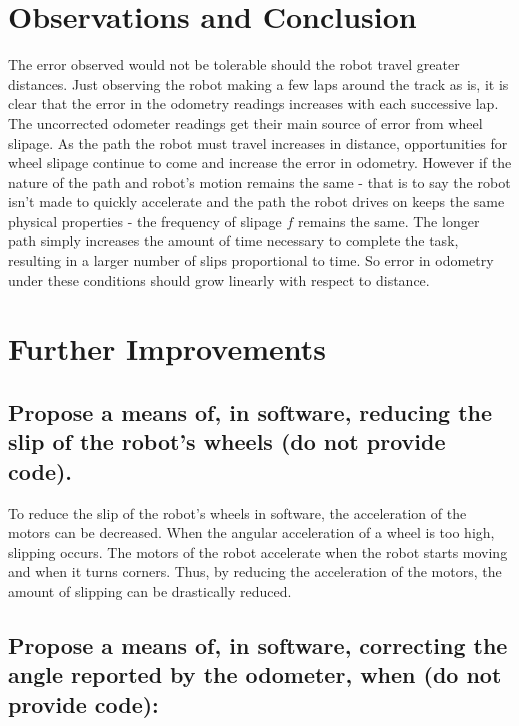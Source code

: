 \documentclass[11pt]{article} %
\begin{document}
\section{Observations and Conclusion}
The error observed would not be tolerable should the robot travel greater distances. Just observing the robot making a few laps around the track as is, it is clear that the error in the odometry readings increases with each successive lap. The uncorrected odometer readings get their main source of error from wheel slipage. As the path the robot must travel increases in distance, opportunities for wheel slipage continue to come and increase the error in odometry. However if the nature of the path and robot's motion remains the same - that is to say the robot isn't made to quickly accelerate and the path the robot drives on keeps the same physical properties - the frequency of slipage $f$ remains the same. The longer path simply increases the amount of time necessary to complete the task, resulting in a larger number of slips proportional to time. So error in odometry under these conditions should grow linearly with respect to distance.
\section{Further Improvements}
\subsection{Propose a means of, in software, reducing the slip of the robot's wheels (do not provide code).}
To reduce the slip of the robot's wheels in software, the acceleration of the motors can be
decreased. When the angular acceleration of a wheel is too high, slipping occurs. The motors of the
robot accelerate when the robot starts moving and when it turns corners. Thus, by reducing
the acceleration of the motors, the amount of slipping can be drastically reduced.
\subsection{Propose a means of, in software, correcting the angle reported by the odometer, when (do not provide code):}
\end{document}

